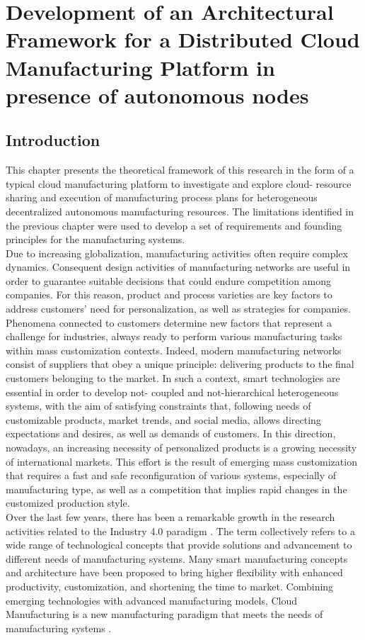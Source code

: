 \chapter{Development of an Architectural Framework for a Distributed Cloud Manufacturing Platform in presence of autonomous nodes}
\section{Introduction}
This chapter presents the theoretical framework of this research in the form of a typical cloud manufacturing platform to investigate and explore cloud- resource sharing and execution of manufacturing process plans for heterogeneous decentralized autonomous manufacturing resources. The limitations identified in the previous chapter were used to develop a set of requirements and founding principles for the manufacturing systems.\\
Due to increasing globalization, manufacturing activities often require complex dynamics. Consequent design activities of manufacturing networks are useful in order to guarantee suitable decisions that could endure competition among companies. For this reason, product and process varieties are key factors to address customers' need for personalization, as well as strategies for companies. Phenomena connected to customers determine new factors that represent a challenge for industries, always ready to perform various manufacturing tasks within mass customization contexts. Indeed, modern manufacturing networks consist of suppliers that obey a unique principle: delivering products to the final customers belonging to the market. In such a context, smart technologies are essential in order to develop not- coupled and not-hierarchical heterogeneous systems, with the aim of satisfying constraints that, following needs of customizable products, market trends, and social media, allows directing expectations and desires, as well as demands of customers. In this direction, nowadays, an increasing necessity of personalized products is a growing necessity of international markets. This effort is the result of emerging mass customization that requires a fast and safe reconfiguration of various systems, especially of manufacturing type, as well as a competition that implies rapid changes in the customized production style.\\
Over the last few years, there has been a remarkable growth in the research activities related to the Industry 4.0 paradigm \parencite{zhou_industry_2015}. The term collectively refers to a wide range of technological concepts that provide solutions and advancement to different needs of manufacturing systems. Many smart manufacturing concepts and architecture have been proposed to bring higher flexibility with enhanced productivity, customization, and shortening the time to market. Combining emerging technologies with advanced manufacturing models, Cloud Manufacturing is a new manufacturing paradigm that meets the needs of manufacturing systems \parencite{kaynak_cloud_2020}.\\
